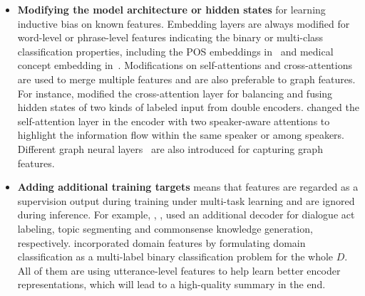 \begin{itemize}
\item \textbf{Modifying the model architecture or hidden states} for learning inductive bias on known features. Embedding layers are always modified for word-level or phrase-level features indicating the binary or multi-class classification properties, including the POS embeddings in~\cite{zhu2020end} and medical concept embedding in~\cite{joshi2020dr}. Modifications on self-attentions and cross-attentions are used to merge multiple features and are also preferable to graph features. For instance, \citet{chen2020multi} modified the cross-attention layer for balancing and fusing hidden states of two kinds of labeled input from double encoders. \citet{lei2021hierarchical} changed the self-attention layer in the encoder with two speaker-aware attentions to highlight the information flow within the same speaker or among speakers. Different graph neural layers~\cite{feng2021incorporating,liu2021coreference,chen2021structure} are also introduced for capturing graph features.

\item \textbf{Adding additional training targets} means that features are regarded as a supervision output during training under multi-task learning and are ignored during inference. For example, \citet{goo2018abstractive}, \citet{li2019keep}, \citet{kim2022mind} used an additional decoder for dialogue act labeling, topic segmenting and commonsense knowledge generation, respectively.
\citet{yuan2019scaffolds} incorporated domain features by formulating domain classification as a multi-label binary classification problem for the whole $D$. All of them are using utterance-level features to help learn better encoder representations, which will lead to a high-quality summary in the end.

\end{itemize}

